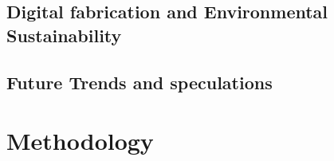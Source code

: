 \documentclass[final,5p,times]{elsarticle}
\begin{document}
\begin{linenumbers}
    \subsection{Digital fabrication and Environmental Sustainability}
    \label{subsec:DigitalFabricationAndEnvSustainability}
    

    \subsection{Future Trends and speculations}
    \label{subsec:Futuretrends}
    

\section{Methodology}
\label{sec:Methodology}


\end{linenumbers}

\pagebreak

    
    
\end{document}
